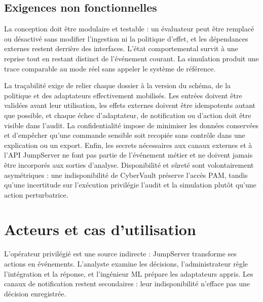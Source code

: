 \documentclass[11pt,a4paper,oneside]{report}
\theoremstyle{definition}
\theoremstyle{plain}
\begin{document}
\subsection{Exigences non fonctionnelles}

La conception doit être modulaire et testable : un évaluateur peut être
remplacé ou désactivé sans modifier l'ingestion ni la politique d'effet, et les
dépendances externes restent derrière des interfaces. L'état comportemental
survit à une reprise tout en restant distinct de l'événement courant. La
simulation produit une trace comparable au mode réel sans appeler le système
de référence.

La traçabilité exige de relier chaque dossier à la version du schéma, de la
politique et des adaptateurs effectivement mobilisés. Les entrées doivent être
validées avant leur utilisation, les effets externes doivent être idempotents
autant que possible, et chaque échec d'adaptateur, de notification ou d'action
doit être visible dans l'audit. La confidentialité impose de minimiser les
données conservées et d'empêcher qu'une commande sensible soit recopiée sans
contrôle dans une explication ou un export. Enfin, les secrets nécessaires aux
canaux externes et à l'API JumpServer ne font pas partie de l'événement métier
et ne doivent jamais être incorporés aux sorties d'analyse. Disponibilité et sûreté sont volontairement asymétriques : une indisponibilité
de CyberVault préserve l'accès PAM, tandis qu'une incertitude sur l'exécution
privilégie l'audit et la simulation plutôt qu'une action perturbatrice.

\section{Acteurs et cas d'utilisation}
\label{sec:impl-use-cases}

L'opérateur privilégié est une source indirecte : JumpServer transforme ses
actions en événements. L'analyste examine les décisions, l'administrateur règle
l'intégration et la réponse, et l'ingénieur ML prépare les adaptateurs appris.
Les canaux de notification restent secondaires : leur indisponibilité
n'efface pas une décision enregistrée.
\end{document}
